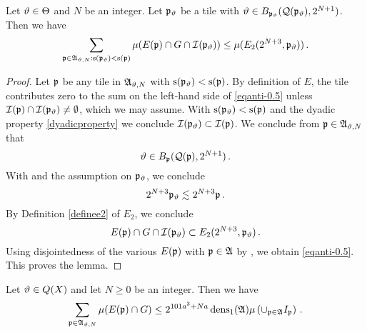 \begin{lemma}\label{local-antichain-density}
\leanok
{}
Let ${\vartheta}\in{\Theta}$ and {$N$} be
an integer. Let ${\mathfrak p}_{{\vartheta}}$ be a tile with ${\vartheta}\in B_{{\mathfrak p}_{{\vartheta}}}({\mathcal{Q}}({\mathfrak p}_{{\vartheta}}), 2^{N+1})$.
Then we have
\begin{equation}\label{eqanti-0.5}
    \sum_{{\mathfrak p}\in\mathfrak{A}_{{\vartheta},N}: {\mathrm{s}}({\mathfrak p}_{{\vartheta}})<{\mathrm{s}}({\mathfrak p})}\mu(E({\mathfrak p})\cap G \cap {\mathcal{I}}({\mathfrak p}_{{\vartheta}}))
    \le \mu (E_2(2^{N+3},{\mathfrak p}_{{\vartheta}}))
 \, .
\end{equation}



\end{lemma}

\begin{proof}
\leanok

Let ${\mathfrak p}$ be any tile in $\mathfrak{A}_{{\vartheta},N}$ with ${\mathrm{s}}({\mathfrak p}_{{\vartheta}})<{\mathrm{s}}({\mathfrak p})$. By definition of
$E$, the tile contributes zero to the sum on the left-hand side of \eqref{eqanti-0.5} unless
 ${\mathcal{I}}({\mathfrak p})\cap {\mathcal{I}}({\mathfrak p}_{{\vartheta}}) \neq \emptyset$, which we may assume. With ${\mathrm{s}}({\mathfrak p}_{{\vartheta}})<{\mathrm{s}}({\mathfrak p})$
and the dyadic property
\eqref{dyadicproperty} we conclude ${\mathcal{I}}({\mathfrak p}_{{\vartheta}})\subset {\mathcal{I}}({\mathfrak p})$.
We conclude from ${\mathfrak p} \in \mathfrak{A}_{{\vartheta},N}$ that
\begin{equation}
    {\vartheta} \in B_{\mathfrak p}({\mathcal{Q}}({\mathfrak p}), 2^{N+1})\, .
\end{equation}
With  and the assumption on ${\mathfrak p}_{\vartheta}$, we conclude
\begin{equation}
    2^{N+3}{\mathfrak p}_{{\vartheta}} \lesssim 2^{N+3}{\mathfrak p} \, .
\end{equation}
By Definition \eqref{definee2} of $E_2$, we conclude
\begin{equation}
    E({\mathfrak p})\cap G \cap {\mathcal{I}}({\mathfrak p}_{{\vartheta}}) \subset E_2(2^{N+3},{\mathfrak p}_{{\vartheta}})\, .
\end{equation}
Using disjointedness of the various $E({\mathfrak p})$ with ${\mathfrak p}\in \mathfrak{A}$ by , we obtain \eqref{eqanti-0.5}.
This proves the lemma.
\end{proof}
\begin{lemma}
\label{global-antichain-density}
\leanok
{}
Let ${\vartheta}\in Q(X)$ and let $N\ge 0$ be
an integer. Then we have
\begin{equation}\label{eqanti00}
    \sum_{{\mathfrak p}\in\mathfrak{A}_{{\vartheta},N}}\mu(E({\mathfrak p})\cap G)
    \le
 2^{101a^3+Na}\operatorname{\operatorname{dens}}_1(\mathfrak{A})\mu\left(\cup_{{\mathfrak p}\in\mathfrak{A}}I_{{\mathfrak p}}\right)\, .
\end{equation}
\end{lemma}



